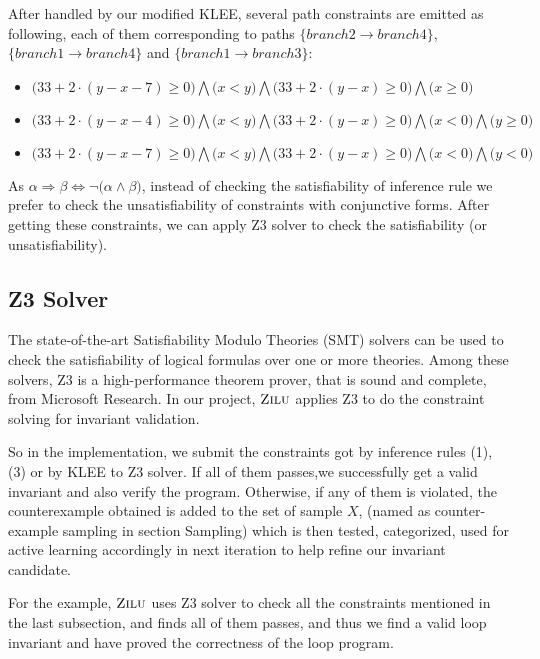 After handled by our modified KLEE,
several path constraints are emitted as following, each of them corresponding to paths 
$\{branch2 \to branch4\}$, $\{branch1 \to branch4\}$ and $\{branch1 \to branch3\}$:


\begin{itemize}
\item $\big(33+2\cdot(y-x-7)\ge0\big) \bigwedge \big(x<y\big) \bigwedge \big(33+2\cdot(y-x)\ge0\big) \bigwedge \big(x\ge0\big)$
\item $\big(33+2\cdot(y-x-4)\ge0\big) \bigwedge \big(x<y\big) \bigwedge \big(33+2\cdot(y-x)\ge0\big) \bigwedge \big(x<0\big) \bigwedge \big(y\ge0\big)$
\item $\big(33+2\cdot(y-x-7)\ge0\big) \bigwedge \big(x<y\big) \bigwedge \big(33+2\cdot(y-x)\ge0\big) \bigwedge \big(x<0\big) \bigwedge \big(y<0\big)$
\end{itemize}
As $\alpha \Rightarrow \beta \Longleftrightarrow \neg \big(\alpha \wedge \beta\big)$, 
instead of checking the satisfiability of inference rule
we prefer to check the unsatisfiability of constraints with conjunctive forms. 
After getting these constraints, we can apply Z3 solver to check the satisfiability (or unsatisfiability).

\subsection{Z3 Solver}
The state-of-the-art Satisfiability Modulo Theories (SMT) solvers can be used to check the satisfiability of logical formulas over one or more theories. 
Among these solvers, Z3 is a high-performance theorem prover, that is sound and complete, from Microsoft Research.
In our project, $\textsc{Zilu}$ applies Z3 to do the constraint solving for invariant validation. 

So in the implementation, we submit the constraints got by inference rules (1), (3) or by KLEE to Z3 solver.
If all of them passes,we successfully get a valid invariant and also verify the program. 
Otherwise, if any of them is violated, the counterexample obtained is added to the set of sample $X$, 
(named as counter-example sampling in section Sampling)
which is then tested, categorized, used for active learning accordingly in next iteration to help refine our invariant candidate.

For the example, $\textsc{Zilu}$ uses Z3 solver to check all the constraints mentioned in the last subsection,
and finds all of them passes, and thus we find a valid loop invariant and have proved the correctness of the loop program.

